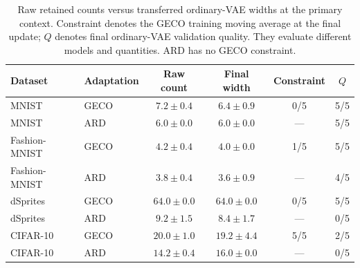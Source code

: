 \begin{table}[H]
\caption{Raw retained counts versus transferred ordinary-VAE widths at the primary context. Constraint denotes the GECO training moving average at the final update; $Q$ denotes final ordinary-VAE validation quality. They evaluate different models and quantities. ARD has no GECO constraint.}\label{tab:pruning}
\footnotesize
\setlength{\tabcolsep}{3.5pt}
\begin{tabular*}{\textwidth}{@{\extracolsep{\fill}}llcccc@{}}
\toprule
Dataset & Adaptation & Raw count & Final width & Constraint & $Q$ \\
\midrule
MNIST & GECO & $7.2 \pm 0.4$ & $6.4 \pm 0.9$ & 0/5 & 5/5 \\
MNIST & ARD & $6.0 \pm 0.0$ & $6.0 \pm 0.0$ & --- & 5/5 \\
Fashion-MNIST & GECO & $4.2 \pm 0.4$ & $4.0 \pm 0.0$ & 1/5 & 5/5 \\
Fashion-MNIST & ARD & $3.8 \pm 0.4$ & $3.6 \pm 0.9$ & --- & 4/5 \\
dSprites & GECO & $64.0 \pm 0.0$ & $64.0 \pm 0.0$ & 0/5 & 5/5 \\
dSprites & ARD & $9.2 \pm 1.5$ & $8.4 \pm 1.7$ & --- & 0/5 \\
CIFAR-10 & GECO & $20.0 \pm 1.0$ & $19.2 \pm 4.4$ & 5/5 & 2/5 \\
CIFAR-10 & ARD & $14.2 \pm 0.4$ & $16.0 \pm 0.0$ & --- & 0/5 \\
\bottomrule
\end{tabular*}
\end{table}

